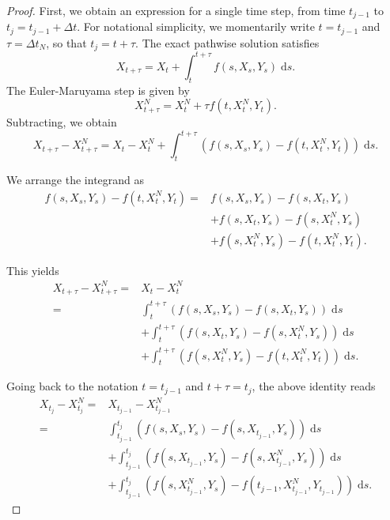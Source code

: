 \documentclass[reqno,12pt]{amsart}
\theoremstyle{plain}%
\theoremstyle{definition}
\begin{document}
\begin{proof}
First, we obtain an expression for a single time step, from time $t_{j-1}$ to $t_j = t_{j-1} + \Delta t$. For notational simplicity, we momentarily write $t = t_{j-1}$ and $\tau = \Delta t_N$, so that $t_j = t + \tau$. The exact pathwise solution satisfies
$$
X_{t + \tau} = X_t + \int_t^{t + \tau} f(s, X_s, Y_s) \;\mathrm{d}s.
$$
The Euler-Maruyama step is given by
$$
X_{t+\tau}^N = X_t^N + \tau f(t, X_t^N, Y_t).
$$
Subtracting, we obtain
$$
X_{t + \tau} - X_{t + \tau}^N = X_t - X_t^N + \int_t^{t + \tau} \left( f(s, X_s, Y_s) - f(t, X_t^N, Y_t) \right)\;\mathrm{d}s.
$$

We arrange the integrand as
\begin{align*}
f(s, X_s, Y_s) - f(t, X_t^N, Y_t) = & f(s, X_s, Y_s) - f(s, X_t, Y_s) \\ 
 & + f(s, X_t, Y_s) - f(s, X_t^N, Y_s) \\
 & + f(s, X_t^N, Y_s) - f(t, X_t^N, Y_t).
\end{align*}

This yields
\begin{align*}
    X_{t + \tau} - X_{t + \tau}^N  = & X_t - X_t^N \\
    = &  \int_t^{t + \tau} \left( f(s, X_s, Y_s) - f(s, X_t, Y_s) \right)\;\mathrm{d}s \\ 
    & + \int_t^{t + \tau} \left( f(s, X_t, Y_s) - f(s, X_t^N, Y_s) \right)\;\mathrm{d}s \\
    & + \int_t^{t + \tau} \left( f(s, X_t^N, Y_s) - f(t, X_t^N, Y_t) \right)\;\mathrm{d}s.
\end{align*}

Going back to the notation $t = t_{j-1}$ and $t + \tau = t_j$, the above identity reads
\begin{equation}
    \label{singlestep}
    \begin{aligned}
        X_{t_j} - X_{t_j}^N  = & X_{t_{j-1}} - X_{t_{j-1}}^N \\
        = &  \int_{t_{j-1}}^{t_j} \left( f(s, X_s, Y_s) - f(s, X_{t_{j-1}}, Y_s) \right)\;\mathrm{d}s \\ 
        & + \int_{t_{j-1}}^{t_j} \left( f(s, X_{t_{j-1}}, Y_s) - f(s, X_{t_{j-1}}^N, Y_s) \right)\;\mathrm{d}s \\
        & + \int_{t_{j-1}}^{t_j} \left( f(s, X_{t_{j-1}}^N, Y_s) - f(t_{j-1}, X_{t_{j-1}}^N, Y_{t_{j-1}}) \right)\;\mathrm{d}s.
    \end{aligned}
\end{equation}


\end{proof}
\end{document}
